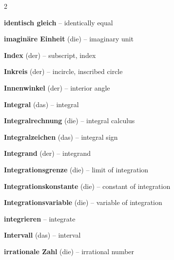 \begin{multicols}{2}
\par\nopagebreak
\textbf{identisch gleich} -- identically equal\dotfill\hyperref[e:62]{\pageref*{e:62}}\par
\textbf{imaginäre Einheit} (die) -- imaginary unit\dotfill\hyperref[e:11]{\pageref*{e:11}}\par
\textbf{Index} (der) -- subscript, index\dotfill\hyperref[e:4]{\pageref*{e:4}}\par
\textbf{Inkreis} (der) -- incircle, inscribed circle\dotfill\hyperref[e:193]{\pageref*{e:193}}\par
\textbf{Innenwinkel} (der) -- interior angle\dotfill\hyperref[e:178]{\pageref*{e:178}}\par
\textbf{Integral} (das) -- integral\dotfill\hyperref[e:295]{\pageref*{e:295}}\par
\textbf{Integralrechnung} (die) -- integral calculus\dotfill\hyperref[e:286]{\pageref*{e:286}}\par
\textbf{Integralzeichen} (das) -- integral sign\dotfill\hyperref[e:289]{\pageref*{e:289}}\par
\textbf{Integrand} (der) -- integrand\dotfill\hyperref[e:290]{\pageref*{e:290}}\par
\textbf{Integrationsgrenze} (die) -- limit of integration\dotfill\hyperref[e:297]{\pageref*{e:297}}\par
\textbf{Integrationskonstante} (die) -- constant of integration\dotfill\hyperref[e:292]{\pageref*{e:292}}\par
\textbf{Integrationsvariable} (die) -- variable of integration\dotfill\hyperref[e:291]{\pageref*{e:291}}\par
\textbf{integrieren} -- integrate\dotfill\hyperref[e:296]{\pageref*{e:296}}\par
\textbf{Intervall} (das) -- interval\dotfill\hyperref[e:270]{\pageref*{e:270}}\par
\textbf{irrationale Zahl} (die) -- irrational number\dotfill\hyperref[e:9]{\pageref*{e:9}}\par


\end{multicols}
